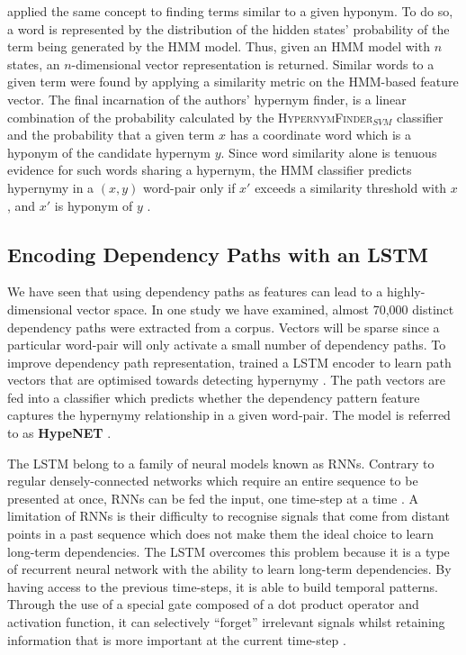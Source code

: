 \citeauthor{ritter2009anyway} applied the same concept to finding terms similar to a given hyponym.  To do so, a word is represented by the distribution of the hidden states’ probability of the term being generated by the \ac{HMM} model.  Thus, given an \ac{HMM} model with $n$ states, an $n$-dimensional vector representation is returned.  Similar words to a given term were found by applying a similarity metric on the \ac{HMM}-based feature vector.  The final incarnation of the authors' hypernym finder, is a linear combination of the probability calculated by the \textsc{HypernymFinder$_{SVM}$} classifier and the probability that a given term $x$ has a coordinate word which is a hyponym of the candidate hypernym $y$. Since word similarity alone is tenuous evidence for such words sharing a hypernym, the \ac{HMM} classifier predicts hypernymy in a $(x, y)$ word-pair only if $x'$ exceeds a similarity threshold with $x$, and $x'$ is hyponym of $y$ \citep{ritter2009anyway}.

\subsection{Encoding Dependency Paths with an LSTM}
We have seen that using dependency paths as features can lead to a highly-dimensional vector space.  In one study we have examined, almost 70,000 distinct dependency paths were extracted from a corpus.  Vectors will be sparse since a particular word-pair will only activate a small number of dependency paths.  To improve dependency path representation, \citeauthor{shwartz2016path} trained a \ac{LSTM} \citep{hochreiter1997long} encoder to learn path vectors that are optimised towards detecting hypernymy \citep{shwartz2016path}.  The path vectors are fed into a classifier which predicts whether the dependency pattern feature captures the hypernymy relationship in a given word-pair.  The model is referred to as \textbf{HypeNET} \citep{shwartz2016path}.

The LSTM belong to a family of neural models known as \ac{RNN}s.  Contrary to regular densely-connected networks which require an entire sequence to be presented at once, \ac{RNN}s can be fed the input, one time-step at a time \citep{chollet2017deep}.  A limitation of \ac{RNN}s is their difficulty to recognise signals that come from distant points in a past sequence which does not make them the ideal choice to learn long-term dependencies.  The \ac{LSTM} overcomes this problem because it is a type of recurrent neural network with the ability to learn long-term dependencies.  By having access to the previous time-steps, it is able to build temporal patterns.  Through the use of a special gate composed of a dot product operator and activation function, it can selectively “forget” irrelevant signals whilst retaining information that is more important at the current time-step \citep{chollet2017deep}.  

